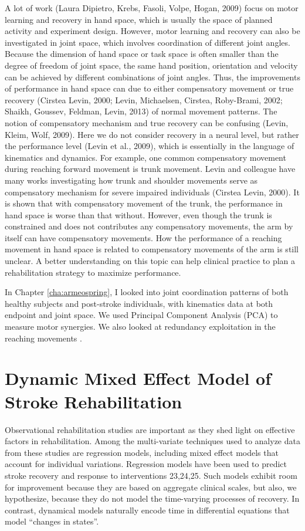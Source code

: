 A lot of work (Laura Dipietro, Krebs, Fasoli, Volpe,  Hogan, 2009) focus on motor learning and recovery in hand space, which is usually the space of planned activity and experiment design. 
However, motor learning and recovery can also be investigated in joint space, which involves coordination of different joint angles. 
Because the dimension of hand space or task space is often smaller than the degree of freedom of joint space, the same hand position, orientation and velocity can be achieved by different combinations of joint angles. 
Thus, the improvements of performance in hand space can due to either compensatory movement or true recovery (Cirstea  Levin, 2000; Levin, Michaelsen, Cirstea,  Roby-Brami, 2002; Shaikh, Goussev, Feldman,  Levin, 2013) of normal movement patterns.
The notion of compensatory mechanism and true recovery can be confusing (Levin, Kleim,  Wolf, 2009). 
Here we do not consider recovery in a neural level, but rather the performance level (Levin et al., 2009), which is essentially in the language of kinematics and dynamics. 
For example, one common compensatory movement during reaching forward movement is trunk movement. 
Levin and colleague have many works investigating how trunk and shoulder movements serve as compensatory mechanism for severe impaired individuals (Cirstea  Levin, 2000). 
It is shown that with compensatory movement of the trunk, the performance in hand space is worse than that without. 
However, even though the trunk is constrained and does not contributes any compensatory movements, the arm by itself can have compensatory movements. 
How the performance of a reaching movement in hand space is related to compensatory movements of the arm is still unclear. 
A better understanding on this topic can help clinical practice to plan a rehabilitation strategy to maximize performance.

In Chapter \ref{cha:armeospring}, I looked into joint coordination patterns of both healthy subjects and post-stroke individuals, with kinematics data at both endpoint and joint space. 
We used Principal Component Analysis (PCA) to measure motor synergies.
We also looked at redundancy exploitation in the reaching movements \cite{singh}.

\section{Dynamic Mixed Effect Model of Stroke Rehabilitation}
Observational rehabilitation studies are important as they shed light on effective factors in rehabilitation.
Among the multi-variate techniques used to analyze data from these studies are regression models, including mixed effect models that account for individual variations. 
Regression models have been used to predict stroke recovery \cite{19-22} and response to interventions {23,24,25}. 
Such models exhibit room for improvement because they are based on aggregate clinical scales, but also, we hypothesize, because they do not model the time-varying processes of recovery. 
In contrast, dynamical models naturally encode time in differential equations that model “changes in states”. 

